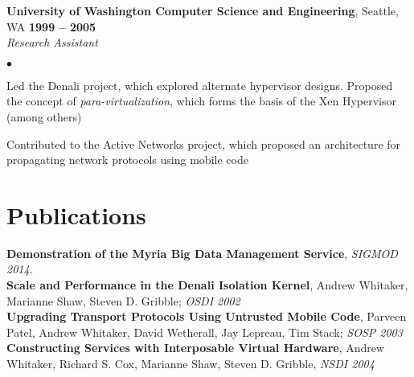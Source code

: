 \documentclass[margin,line]{res}
\newenvironment{list2}{
  \begin{list}{$\bullet$}{%
      \setlength{\itemsep}{0in}
      \setlength{\parsep}{0in} \setlength{\parskip}{0in}
      \setlength{\topsep}{0in} \setlength{\partopsep}{0in} 
      \setlength{\leftmargin}{0.2in}}}{\end{list}}
\begin{document}
\begin{resume}
\textbf{University of Washington Computer Science and Engineering}, Seattle,
WA \hfill \textbf{1999 -- 2005}\\\vspace{-4mm}
\textsl{Research Assistant} \\
\begin{list2}
  \item Led the Denali project, which explored alternate hypervisor
    designs.  Proposed the concept of \textit{para-virtualization}, which forms the
    basis of the Xen Hypervisor (among others)
 \item Contributed to the Active Networks project, which proposed an
   architecture for propagating network protocols using mobile code
\end{list2}

\section{\sc Publications}
\textbf{Demonstration of the Myria Big Data Management Service}, \textit{SIGMOD 2014}.\\
\textbf{Scale and Performance in the Denali Isolation Kernel}, Andrew
Whitaker, Marianne Shaw, Steven D. Gribble; \textit{OSDI 2002}\\
\textbf{Upgrading Transport Protocols Using Untrusted Mobile Code}, Parveen
Patel, Andrew Whitaker, David Wetherall, Jay Lepreau, Tim Stack; \textit{SOSP 2003} \\
\textbf{Constructing Services with Interposable Virtual Hardware}, Andrew
Whitaker, Richard S. Cox, Marianne Shaw, Steven D. Gribble, \textit{NSDI 2004}\\

\end{resume}
\end{document}
